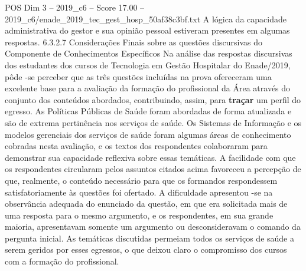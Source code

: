 \begin{textsample}{POS Dim 3 – 2019\_c6 – Score 17.00 – 2019\_c6/enade\_2019\_tec\_gest\_hosp\_50af38c3bf.txt}
A lógica da capacidade administrativa do gestor e sua opinião pessoal estiveram presentes em algumas respostas. 6.3.2.7 Considerações Finais sobre as questões discursivas do Componente de Conhecimentos Específicos Na análise das respostas discursivas dos estudantes dos cursos de Tecnologia em Gestão Hospitalar do Enade/2019, pôde -se perceber que as três questões incluídas na prova ofereceram uma excelente base para a avaliação da formação do profissional da Área através do conjunto dos conteúdos abordados, contribuindo, assim, para \textbf{traçar} um perfil do egresso.
As Políticas Públicas de Saúde foram abordadas de forma atualizada e são de extrema pertinência nos serviços de saúde.
Os Sistemas de Informação e os modelos gerenciais dos serviços de saúde foram algumas áreas de conhecimento cobradas nesta avaliação, e os textos dos respondentes colaboraram para demonstrar sua capacidade reflexiva sobre essas temáticas.
A facilidade com que os respondentes circularam pelos assuntos citados acima favoreceu a percepção de que, realmente, o conteúdo necessário para que os formandos respondessem satisfatoriamente às questões foi ofertado.
A dificuldade apresentou -se na observância adequada do enunciado da questão, em que era solicitada mais de uma resposta para o mesmo argumento, e os respondentes, em sua grande maioria, apresentavam somente um argumento ou desconsideravam o comando da pergunta inicial.
As temáticas discutidas permeiam todos os serviços de saúde a serem geridos por esses egressos, o que deixou claro o compromisso dos cursos com a formação do profissional.

\end{textsample}
